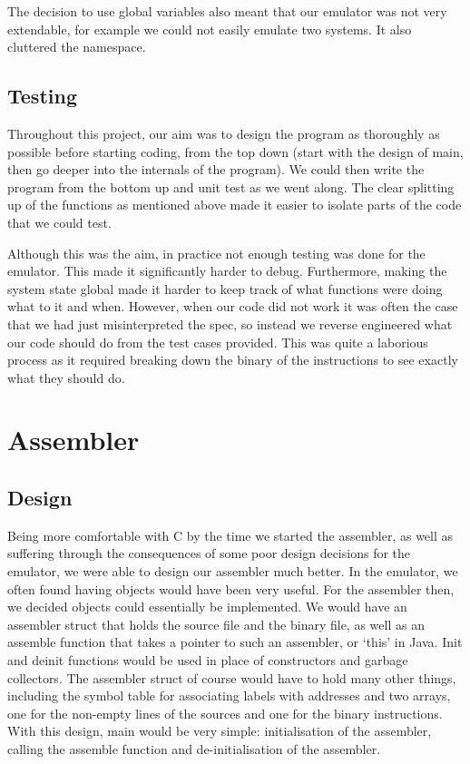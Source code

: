 \documentclass[a4paper]{article}
\begin{document}
The decision to use global variables also meant that our emulator was not very extendable, for example we could not easily emulate two systems. It also cluttered the namespace.

\subsection{Testing}

Throughout this project, our aim was to design the program as thoroughly as possible before starting coding, from the top down (start with the design of main, then go deeper into the internals of the program). We could then write the program from the bottom up and unit test as we went along. The clear splitting up of the functions as mentioned above made it easier to isolate parts of the code that we could test.

Although this was the aim, in practice not enough testing was done for the emulator. This made it significantly harder to debug. Furthermore, making the system state global made it harder to keep track of what functions were doing what to it and when. However, when our code did not work it was often the case that we had just misinterpreted the spec, so instead we reverse engineered what our code should do from the test cases provided. This was quite a laborious process as it required breaking down the binary of the instructions to see exactly what they should do.

\section{Assembler}

\subsection{Design}
Being more comfortable with C by the time we started the assembler, as well as suffering through the consequences of some poor design decisions for the emulator, we were able to design our assembler much better. In the emulator, we often found having objects would have been very useful. For the assembler then, we decided objects could essentially be implemented. We would have an assembler struct that holds the source file and the binary file, as well as an assemble function that takes a pointer to such an assembler, or ‘this’ in Java. Init and deinit functions would be used in place of constructors and garbage collectors. The assembler struct of course would have to hold many other things, including the symbol table for associating labels with addresses and two arrays, one for the non-empty lines of the sources and one for the binary instructions. With this design, main would be very simple: initialisation of the assembler, calling the assemble function and de-initialisation of the assembler.
\end{document}
